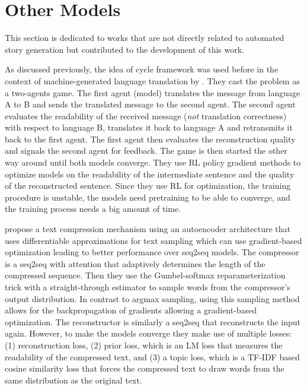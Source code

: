 \section{Other Models}
\label{sec:other_rel_models}

This section is dedicated to works that are not directly related to automated story generation but contributed to the development of this work.

As discussed previously, the idea of cycle framework was used before in the context of machine-generated language translation by \citep{he2016dual}. They cast the problem as a two-agents game. The first agent (model) translates the message from language A to B and sends the translated message to the second agent. The second agent evaluates the readability of the received message (\textit{not} translation correctness) with respect to language B, translates it back to language A and retransmits it back to the first agent. The first agent then evaluates the reconstruction quality and signals the second agent for feedback. The game is then started the other way around until both models converge. They use RL policy gradient methods to optimize models on the readability of the intermediate sentence and the quality of the reconstructed sentence. Since they use RL for optimization, the training procedure is unstable, the models need pretraining to be able to converge, and the training process needs a big amount of time.

\citep{baziotis2019seq} propose a text compression mechanism using an autoencoder architecture that uses differentiable approximations for text sampling which can use gradient-based optimization leading to better performance over seq2seq models. The compressor is a seq2seq with attention that adaptively determines the length of the compressed sequence. Then they use the Gumbel-softmax reparameterization trick with a straight-through estimator to sample words from the compressor's output distribution. In contrast to argmax sampling, using this sampling method allows for the backpropagation of gradients allowing a gradient-based optimization. The reconstructor is similarly a seq2seq that reconstructs the input again. However, to make the models converge they make use of multiple losses: (1) reconstruction loss, (2) prior loss, which is an LM loss that measures the readability of the compressed text, and (3) a topic loss, which is a TF-IDF based cosine similarity loss that forces the compressed text to draw words from the same distribution as the original text.


